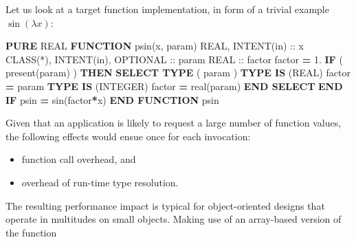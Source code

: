 \documentclass[
]{article}
\newenvironment{Shaded}{}{}
\newcommand{\BuiltInTok}[1]{\textcolor[rgb]{0.00,0.50,0.00}{#1}}
\newcommand{\DataTypeTok}[1]{\textcolor[rgb]{0.56,0.13,0.00}{#1}}
\newcommand{\FloatTok}[1]{\textcolor[rgb]{0.25,0.63,0.44}{#1}}
\newcommand{\FunctionTok}[1]{\textcolor[rgb]{0.02,0.16,0.49}{#1}}
\newcommand{\KeywordTok}[1]{\textcolor[rgb]{0.00,0.44,0.13}{\textbf{#1}}}
\newcommand{\NormalTok}[1]{#1}
\providecommand{\tightlist}{%
  \setlength{\itemsep}{0pt}\setlength{\parskip}{0pt}}
\begin{document}
Let us look at a target function implementation, in form of a trivial
example \(\sin(\lambda x)\):

\begin{Shaded}
\begin{Highlighting}[]
\KeywordTok{PURE} \DataTypeTok{REAL} \KeywordTok{FUNCTION}\NormalTok{ psin(x, param)}
   \DataTypeTok{REAL}\NormalTok{, }\DataTypeTok{INTENT(in)} \DataTypeTok{::}\NormalTok{ x}
   \DataTypeTok{CLASS(*)}\NormalTok{, }\DataTypeTok{INTENT(in)}\NormalTok{, }\DataTypeTok{OPTIONAL} \DataTypeTok{::}\NormalTok{ param}
   \DataTypeTok{REAL} \DataTypeTok{::}\NormalTok{ factor}
\NormalTok{   factor }\KeywordTok{=} \FloatTok{1.}
   \KeywordTok{IF}\NormalTok{ ( }\FunctionTok{present}\NormalTok{(param) ) }\KeywordTok{THEN}
      \KeywordTok{SELECT TYPE}\NormalTok{ ( param )}
      \KeywordTok{TYPE IS}\NormalTok{ (}\DataTypeTok{REAL}\NormalTok{)}
\NormalTok{         factor }\KeywordTok{=}\NormalTok{ param}
      \KeywordTok{TYPE IS}\NormalTok{ (}\DataTypeTok{INTEGER}\NormalTok{)}
\NormalTok{         factor }\KeywordTok{=} \DataTypeTok{real(param)}
      \KeywordTok{END SELECT}
   \KeywordTok{END IF}
\NormalTok{   psin }\KeywordTok{=} \BuiltInTok{sin}\NormalTok{(factor}\KeywordTok{*}\NormalTok{x)}
\KeywordTok{END FUNCTION}\NormalTok{ psin}
\end{Highlighting}
\end{Shaded}

Given that an application is likely to request a large number of
function values, the following effects would ensue once for each
invocation:

\begin{itemize}
\tightlist
\item
  function call overhead, and
\item
  overhead of run-time type resolution.
\end{itemize}

The resulting performance impact is typical for object-oriented designs
that operate in multitudes on small objects. Making use of an
array-based version of the function
\end{document}
